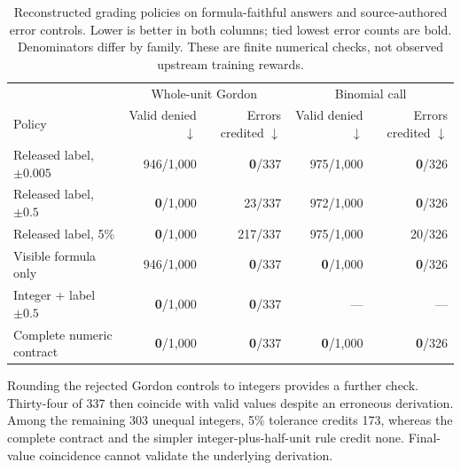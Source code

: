 \begin{table}[!ht]
\centering\small
\setlength{\tabcolsep}{3pt}
\begin{tabular}{@{}lrrrr@{}}
\toprule
& \multicolumn{2}{c}{Whole-unit Gordon} & \multicolumn{2}{c}{Binomial call}\\
Policy & \shortstack{Valid denied\\$\downarrow$} & \shortstack{Errors credited\\$\downarrow$} & \shortstack{Valid denied\\$\downarrow$} & \shortstack{Errors credited\\$\downarrow$}\\
\midrule
Released label, $\pm0.005$ & 946/1,000 & \textbf{0}/337 & 975/1,000 & \textbf{0}/326\\
Released label, $\pm0.5$ & \textbf{0}/1,000 & 23/337 & 972/1,000 & \textbf{0}/326\\
Released label, 5\% & \textbf{0}/1,000 & 217/337 & 975/1,000 & 20/326\\
Visible formula only & 946/1,000 & \textbf{0}/337 & \textbf{0}/1,000 & \textbf{0}/326\\
Integer + label $\pm0.5$ & \textbf{0}/1,000 & \textbf{0}/337 & --- & ---\\
Complete numeric contract & \textbf{0}/1,000 & \textbf{0}/337 & \textbf{0}/1,000 & \textbf{0}/326\\
\bottomrule
\end{tabular}
\caption{Reconstructed grading policies on formula-faithful answers and source-authored error controls. Lower is better in both columns; tied lowest error counts are bold. Denominators differ by family. These are finite numerical checks, not observed upstream training rewards.}
\label{tab:policy-comparison}
\end{table}
\FloatBarrier

Rounding the rejected Gordon controls to integers provides a further check. Thirty-four of 337 then coincide with valid values despite an erroneous derivation. Among the remaining 303 unequal integers, 5\% tolerance credits 173, whereas the complete contract and the simpler integer-plus-half-unit rule credit none. Final-value coincidence cannot validate the underlying derivation.

